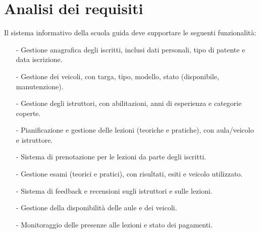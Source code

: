 \documentclass[10pt]{article}
\begin{document}
\section{Analisi dei requisiti}{
    Il sistema informativo della scuola guida deve supportare le seguenti funzionalità:

    \begin{itemize}
        \item[-] Gestione anagrafica degli iscritti, inclusi dati personali, tipo di patente e data iscrizione.
        \item[-] Gestione dei veicoli, con targa, tipo, modello, stato (disponibile, manutenzione).
        \item[-] Gestione degli istruttori, con abilitazioni, anni di esperienza e categorie coperte.
        \item[-] Pianificazione e gestione delle lezioni (teoriche e pratiche), con aula/veicolo e istruttore.
        \item[-] Sistema di prenotazione per le lezioni da parte degli iscritti.
        \item[-] Gestione esami (teorici e pratici), con risultati, esiti e veicolo utilizzato.
        \item[-] Sistema di feedback e recensioni sugli istruttori e sulle lezioni.
        \item[-] Gestione della disponibilità delle aule e dei veicoli.
        \item[-] Monitoraggio delle presenze alle lezioni e stato dei pagamenti.
    \end{itemize}
}
\end{document}
